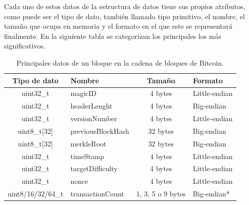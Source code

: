 \documentclass{article}
\begin{document}
    Cada uno de estos datos de la estructura de datos tiene sus propios atributos, como puede ser el tipo de dato, también llamado tipo primitivo, el nombre, el tamaño que ocupa en memoria y el formato en el que este se representará finalmente. En la siguiente tabla se categorizan los principales los más significativos.
    \begin{table}[H]
    \centering
    \begin{tabular}{| c | l | c | l |} 
        \hline
        Tipo de dato & Nombre & Tamaño & Formato \\
        \hline
        uint32\_t & magicID & 4 bytes & Little-endian \\
        \hline
        uint32\_t & headerLenght & 4 bytes & Big-endian \\
        \hline
        uint32\_t & versionNumber & 4 bytes & Little-endian \\
        \hline
        uint8\_t[32] & previousBlockHash & 32 bytes & Big-endian \\
        \hline
        uint8\_t[32] & merkleRoot & 32 bytes & Big-endian \\
        \hline
        uint32\_t & timeStamp & 4 bytes & Little-endian \\
        \hline
        uint32\_t & targetDifficulty & 4 bytes & Little-endian \\
        \hline
        uint32\_t & nonce & 4 bytes & Little-endian \\
        \hline
        uint8/16/32/64\_t & transactionCount & 1, 3, 5 o 9 bytes & Big-endian*  \\
        \hline
    \end{tabular}
    \caption{Principales datos de un bloque en la cadena de bloques de Bitcoin.}
    \label{table:0}
    \end{table}
    
\end{document}
